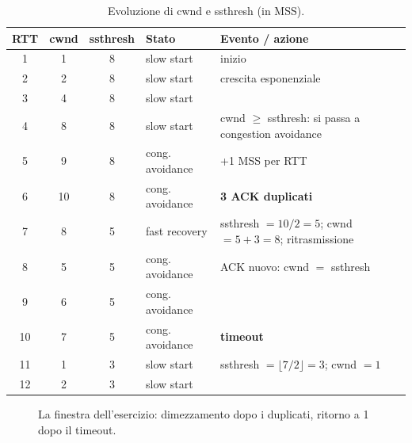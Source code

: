 \svolgimento
\begin{table}[H]
\centering
\small
\begin{tabular}{cccll}
\toprule
\textbf{RTT} & \textbf{cwnd} & \textbf{ssthresh} & \textbf{Stato} & \textbf{Evento / azione} \\
\midrule
1 & 1 & 8 & slow start & inizio \\
2 & 2 & 8 & slow start & crescita esponenziale \\
3 & 4 & 8 & slow start & \\
4 & 8 & 8 & slow start & cwnd $\ge$ ssthresh: si passa a congestion avoidance \\
5 & 9 & 8 & cong. avoidance & +1 MSS per RTT \\
6 & 10 & 8 & cong. avoidance & \textbf{3 ACK duplicati} \\
7 & 8 & 5 & fast recovery & ssthresh $= 10/2 = 5$; cwnd $= 5 + 3 = 8$; ritrasmissione \\
8 & 5 & 5 & cong. avoidance & ACK nuovo: cwnd $=$ ssthresh \\
9 & 6 & 5 & cong. avoidance & \\
10 & 7 & 5 & cong. avoidance & \textbf{timeout} \\
11 & 1 & 3 & slow start & ssthresh $= \lfloor 7/2 \rfloor = 3$; cwnd $= 1$ \\
12 & 2 & 3 & slow start & \\
\bottomrule
\end{tabular}
\caption{Evoluzione di cwnd e ssthresh (in MSS).}
\end{table}

\begin{figure}[H]
\centering
{}
\caption{La finestra dell'esercizio: dimezzamento dopo i duplicati, ritorno a 1 dopo il timeout.}
\end{figure}


